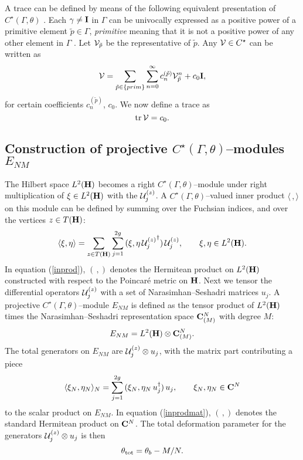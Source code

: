 \documentclass[a4paper,a4paper]{article}
\begin{document}
A trace can be defined by means of the following equivalent presentation of    
$C^{\star}(\Gamma, \theta)$ \cite{PROCEEDINGS}. Each $\gamma\neq {{\bf  I}}$   
in $\Gamma$ can be univocally expressed as a positive power of a primitive element   
$\tilde p\in\Gamma$, {\it primitive} meaning that it is not a positive power of  
any other element in $\Gamma$ \cite{MCKEAN}. Let ${\cal V}_{\tilde p}$ 
be the representative of $\tilde p$. Any ${\cal V} \in C^\star$ can  be written as  
\begin{equation}  
{\cal V}=\sum_{\tilde p\in\{prim\}}\sum_{n=0}^{\infty}c_n^{(\tilde p)}{\cal 
V}_{\tilde p}^n + c_0{{\bf  I}},  
\label{prim}  
\end{equation}  
for certain coefficients $c_n^{(\tilde p)}$, $c_0$. We now define a trace as  
\begin{equation} 
{\rm tr}\,{\cal V}=c_0.  
\label{traccia}
\end{equation} 
  
\subsection{Construction of projective $C^{\star}(\Gamma,\theta)$--modules 
$E_{NM}$}\label{construction}  
  
The Hilbert space $L^2({\bf H})$  becomes a right 
$C^{\star}(\Gamma, \theta)$--module under right multiplication of 
$\xi\in L^2({\bf H})$ with the ${\cal U}_j^{(z)}$. A $C^{\star}(\Gamma, 
\theta)$--valued inner product $\langle\,,\rangle$ on this module 
can be defined by summing over the Fuchsian indices, 
and over the vertices $z\in T({\bf H})$:  
\begin{equation}  
\langle \xi,\eta\rangle=\sum_{z\in T({\bf H})}\sum_{j=1}^{2g}\,  
(\xi,\eta\,{{\cal U}_j^{(z)}}^{\dagger})\,{\cal U}_j^{(z)},
\qquad \xi,\eta\in L^2({\bf H}).  
\label{inprod}
\end{equation}  
In equation (\ref{inprod}), $(\,,)$ denotes the Hermitean product 
on $L^2({\bf H})$ constructed with respect to the Poincar\'e metric 
on ${\bf H}$. Next we tensor the differential operators ${\cal U}_j^{(z)}$ 
with a set of Narasimhan--Seshadri matrices $u_j$. 
A projective $C^{\star}(\Gamma, \theta)$--module 
$E_{NM}$ is defined as the tensor product of $L^2({\bf H})$  
times the Narasimhan--Seshadri representation space ${\bf C}^N_{(M)}$ with degree $M$:
\begin{equation}
E_{NM}=L^2({\bf H})\otimes {\bf C}^N_{(M)}.
\label{totspace}
\end{equation}
The total generators on $E_{NM}$ are ${\cal U}_j^{(z)}\otimes u_j$, 
with the matrix part contributing a piece
\begin{equation}  
\langle \xi_N,\eta_N\rangle_N=\sum_{j=1}^{2g}\,  
(\xi_N,\eta_N\,u_j^{\dagger})\,u_j, \qquad   \xi_N,\eta_N\in {\bf C}^N 
\label{inprodmat}
\end{equation} 
to the scalar product on $E_{NM}$. In equation (\ref{inprodmat}), $(\,,)$ denotes 
the standard Hermitean product on ${\bf C}^N$. The total deformation parameter 
for the generators ${\cal U}_j^{(z)}\otimes u_j$ is then
\begin{equation}  
\theta_{\rm tot}=\theta_b-M/N.  
\label{totdef} 
\end{equation}
  
\end{document}
